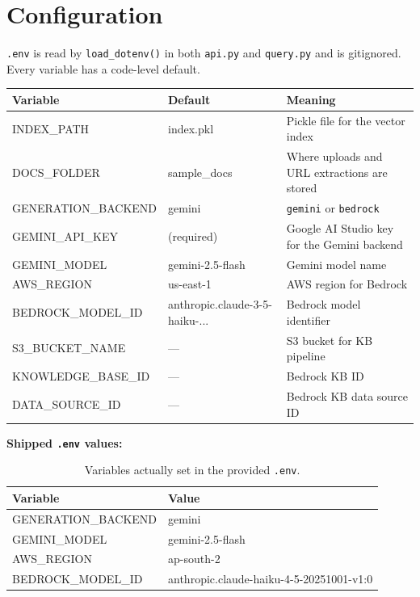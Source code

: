 \documentclass[11pt,a4paper]{paper}
\begin{document}
\section{Configuration}
\label{sec:config}

\texttt{.env} is read by \texttt{load\_dotenv()} in both \texttt{api.py} and \texttt{query.py} and is gitignored. Every variable has a code-level default.

\begin{longtable}{>{\ttfamily}p{3.5cm} >{\ttfamily}p{3.2cm} >{\raggedright\arraybackslash}p{7.8cm}}
\toprule
\textbf{Variable} & \textbf{Default} & \textbf{Meaning} \\
\midrule
\endhead
INDEX\_PATH & index.pkl & Pickle file for the vector index \\
DOCS\_FOLDER & sample\_docs & Where uploads and URL extractions are stored \\
GENERATION\_BACKEND & gemini & \texttt{gemini} or \texttt{bedrock} \\
GEMINI\_API\_KEY & (required) & Google AI Studio key for the Gemini backend \\
GEMINI\_MODEL & gemini-2.5-flash & Gemini model name \\
AWS\_REGION & us-east-1 & AWS region for Bedrock \\
BEDROCK\_MODEL\_ID & anthropic.claude-3-5-haiku-... & Bedrock model identifier \\
S3\_BUCKET\_NAME & — & S3 bucket for KB pipeline \\
KNOWLEDGE\_BASE\_ID & — & Bedrock KB ID \\
DATA\_SOURCE\_ID & — & Bedrock KB data source ID \\
\bottomrule
\end{longtable}
\label{tab:env}

\textbf{Shipped \texttt{.env} values:}

\begin{table}[h]
\centering
\small
\begin{tabular}{>{\ttfamily}p{5.0cm} >{\raggedright\arraybackslash}p{9.5cm}}
\toprule
\textbf{Variable} & \textbf{Value} \\
\midrule
GENERATION\_BACKEND & gemini \\
GEMINI\_MODEL & gemini-2.5-flash \\
AWS\_REGION & ap-south-2 \\
BEDROCK\_MODEL\_ID & anthropic.claude-haiku-4-5-20251001-v1:0 \\
\bottomrule
\end{tabular}
\caption{Variables actually set in the provided \texttt{.env}.}
\label{tab:env-shipped}
\end{table}
\end{document}
